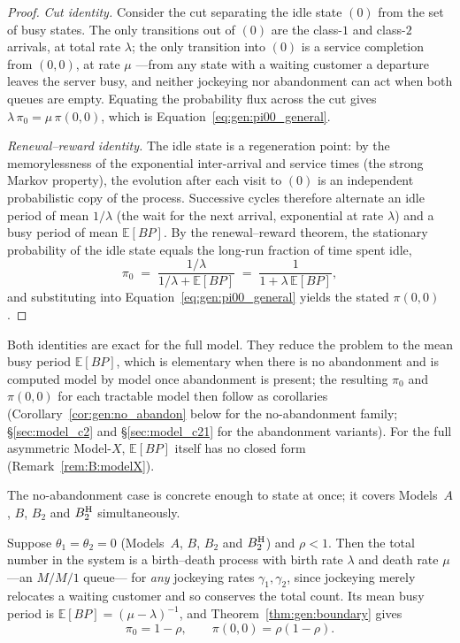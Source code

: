 \begin{proof}
    \emph{Cut identity.} Consider the cut separating the idle state $(0)$ from the set of busy states. The only transitions out of $(0)$ are the class-$1$ and class-$2$ arrivals, at total rate $\lambda$; the only transition into $(0)$ is a service completion from $(0,0)$, at rate $\mu$ ---from any state with a waiting customer a departure leaves the server busy, and neither jockeying nor abandonment can act when both queues are empty. Equating the probability flux across the cut gives $\lambda\,\pi_0=\mu\,\pi(0,0)$, which is Equation~\eqref{eq:gen:pi00_general}.

    \emph{Renewal--reward identity.} The idle state is a regeneration point: by the memorylessness of the exponential inter-arrival and service times (the strong Markov property), the evolution after each visit to $(0)$ is an independent probabilistic copy of the process. Successive cycles therefore alternate an idle period of mean $1/\lambda$ (the wait for the next arrival, exponential at rate $\lambda$) and a busy period of mean $\mathbb{E}[BP]$. By the renewal--reward theorem, the stationary probability of the idle state equals the long-run fraction of time spent idle,
    \begin{equation*}
        \pi_0 \;=\; \frac{1/\lambda}{1/\lambda+\mathbb{E}[BP]} \;=\; \frac{1}{1+\lambda\,\mathbb{E}[BP]},
    \end{equation*}
    and substituting into Equation~\eqref{eq:gen:pi00_general} yields the stated $\pi(0,0)$.
\end{proof}

Both identities are exact for the full model. They reduce the problem to the mean busy period $\mathbb{E}[BP]$, which is elementary when there is no abandonment and is computed model by model once abandonment is present; the resulting $\pi_0$ and $\pi(0,0)$ for each tractable model then follow as corollaries (Corollary~\ref{cor:gen:no_abandon} below for the no-abandonment family; \S\ref{sec:model_c2} and \S\ref{sec:model_c21} for the abandonment variants). For the full asymmetric Model-$X$, $\mathbb{E}[BP]$ itself has no closed form (Remark~\ref{rem:B:modelX}).

The no-abandonment case is concrete enough to state at once; it covers Models~$A$, $B$, $B_2$ and $B_2^{\mathrm{H}}$ simultaneously.

\begin{corollary}\label{cor:gen:no_abandon}
    Suppose $\theta_1=\theta_2=0$ (Models~$A$, $B$, $B_2$ and $B_2^{\mathrm{H}}$) and $\rho<1$. Then the total number in the system is a birth--death process with birth rate $\lambda$ and death rate $\mu$ ---an $M/M/1$ queue--- for \emph{any} jockeying rates $\gamma_1,\gamma_2$, since jockeying merely relocates a waiting customer and so conserves the total count. Its mean busy period is $\mathbb{E}[BP]=(\mu-\lambda)^{-1}$, and Theorem~\ref{thm:gen:boundary} gives
    \begin{equation}
        \pi_0 = 1-\rho, \qquad \pi(0,0)=\rho(1-\rho).
        \label{eq:gen:pi0_noabandon}
    \end{equation}
\end{corollary}


